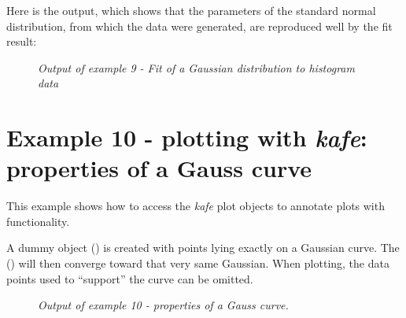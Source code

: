 \documentclass[a4paper,10pt,english]{sphinxmanual}
\begin{document}
Here is the output, which shows that the parameters of the
standard normal distribution, from which the data were generated,
are reproduced well by the fit result:
\begin{figure}[htbp]
\centering
\capstart

\caption{\emph{Output of example 9 - Fit of a Gaussian distribution to histogram data}}\end{figure}


\section{Example 10 - plotting with \emph{kafe}: properties of a Gauss curve}
\label{examples:example-10-plotting-with-kafe-properties-of-a-gauss-curve}
This example shows how to access the \emph{kafe} plot objects
to annotate plots with  functionality.

A dummy object {\hyperref[module_doc:kafe.dataset.Dataset]{\emph{}}} () is
created with points lying exactly on a Gaussian curve.
The {\hyperref[module_doc:kafe.fit.Fit]{\emph{}}} () will then converge toward
that very same Gaussian. When plotting, the data points
used to ``support'' the curve can be omitted.
\begin{figure}[htbp]
\centering
\capstart

\caption{\emph{Output of example 10 - properties of a Gauss curve.}}\end{figure}
\end{document}
